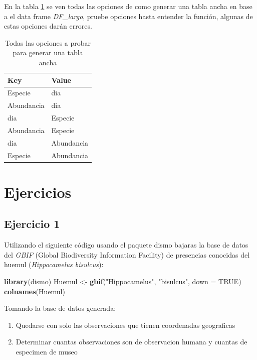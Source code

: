 \documentclass[]{book}
\newenvironment{Shaded}{\begin{snugshade}}{\end{snugshade}}
\newcommand{\DataTypeTok}[1]{\textcolor[rgb]{0.13,0.29,0.53}{#1}}
\newcommand{\KeywordTok}[1]{\textcolor[rgb]{0.13,0.29,0.53}{\textbf{#1}}}
\newcommand{\NormalTok}[1]{#1}
\newcommand{\OtherTok}[1]{\textcolor[rgb]{0.56,0.35,0.01}{#1}}
\newcommand{\StringTok}[1]{\textcolor[rgb]{0.31,0.60,0.02}{#1}}
\begin{document}
En la tabla \ref{tab:Ops} se ven todas las opciones de como generar una
tabla ancha en base a el data frame \emph{DF\_largo}, pruebe opciones
hasta entender la función, algunas de estas opciones darán errores.

\begin{table}

\caption{\label{tab:Ops}Todas las opciones a probar para generar una tabla ancha}
\centering
\begin{tabular}[t]{ll}
\toprule
Key & Value\\
\midrule
Especie & dia\\
Abundancia & dia\\
dia & Especie\\
Abundancia & Especie\\
dia & Abundancia\\
Especie & Abundancia\\
\bottomrule
\end{tabular}
\end{table}

\hypertarget{ejercicios-2}{%
\section{Ejercicios}\label{ejercicios-2}}

\hypertarget{ejercicio-1-2}{%
\subsection{Ejercicio 1}\label{ejercicio-1-2}}

Utilizando el siguiente código usando el paquete dismo bajaras la base
de datos del \emph{GBIF} (Global Biodiversity Information Facility) de
presencias conocidas del huemul (\emph{Hippocamelus bisulcus}):

\begin{Shaded}
\begin{Highlighting}[]
\KeywordTok{library}\NormalTok{(dismo)}
\NormalTok{Huemul <-}\StringTok{ }\KeywordTok{gbif}\NormalTok{(}\StringTok{"Hippocamelus"}\NormalTok{, }\StringTok{"bisulcus"}\NormalTok{, }\DataTypeTok{down =} \OtherTok{TRUE}\NormalTok{)}
\KeywordTok{colnames}\NormalTok{(Huemul)}
\end{Highlighting}
\end{Shaded}

Tomando la base de datos generada:

\begin{enumerate}
\def\labelenumi{\alph{enumi}.}
\item
  Quedarse con solo las observaciones que tienen coordenadas geograficas
\item
  Determinar cuantas observaciones son de observacion humana y cuantas
  de especimen de museo
\end{enumerate}
\end{document}
